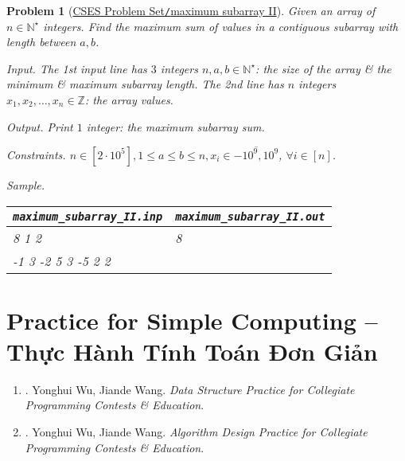 \documentclass{article}
\newtheorem{problem}{Problem}
\begin{document}
\begin{problem}[\href{https://cses.fi/problemset/task/1644}{CSES Problem Set{\tt/}maximum subarray II}]
    Given an array of $n\in\mathbb{N}^\star$ integers. Find the maximum sum of values in a contiguous subarray with length between $a,b$.
    \item {\sf Input.} The 1st input line has $3$ integers $n,a,b\in\mathbb{N}^\star$: the size of the array \& the minimum \& maximum subarray length. The 2nd line has $n$ integers $x_1,x_2,\ldots,x_n\in\mathbb{Z}$: the array values.
    \item {\sf Output.} Print $1$ integer: the maximum subarray sum.
    \item {\sf Constraints.} $n\in[2\cdot10^5],1\le a\le b\le n,x_i\in\overline{-10^9,10^9}$, $\forall i\in[n]$.
    \item {\sf Sample.}
    \begin{table}[H]
        \centering
        \begin{tabular}{|l|l|}
            \hline
            \verb|maximum_subarray_II.inp| & \verb|maximum_subarray_II.out| \\
            \hline
            8 1 2 & 8 \\
            -1 3 -2 5 3 -5 2 2 & \\
            \hline
        \end{tabular}
    \end{table}
\end{problem}


\section{Practice for Simple Computing -- Thực Hành Tính Toán Đơn Giản}

\begin{enumerate}
	\item \cite{Wu_Wang2016}. {\sc Yonghui Wu, Jiande Wang}. {\it Data Structure Practice for Collegiate Programming Contests \& Education}.
	\item \cite{Wu_Wang2018}. {\sc Yonghui Wu, Jiande Wang}. {\it Algorithm Design Practice for Collegiate Programming Contests \& Education}.
\end{enumerate}
\end{document}
